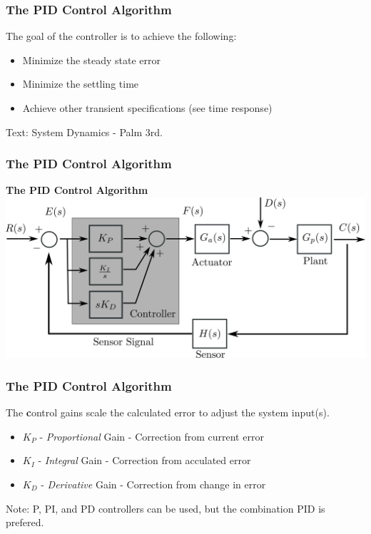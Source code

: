 \documentclass[fleqn]{beamer} %
\newcommand{\sectionIsubsectionIVtitle}{The PID Control Algorithm}
\begin{document}
			\begin{frame}
				\frametitle{\sectionIsubsectionIVtitle}
				\bigskip

				The goal of the controller is to achieve the following:
				\begin{itemize}

					\item Minimize the steady state error
					\item Minimize the settling time
					\item Achieve other transient specifications (see time response)

				\end{itemize}

				\btVFill
				{\tiny Text: System Dynamics - Palm 3rd.}

			\end{frame}	

			\begin{frame}
				\frametitle{\sectionIsubsectionIVtitle}
				\bigskip

				\textbf{The PID Control Algorithm}
				\includegraphics[scale=0.0375]{images/closed_loop_control_pid.png}

				\btVFill
			\end{frame}	

			\begin{frame}
				\frametitle{\sectionIsubsectionIVtitle}
				\bigskip

				The {\textbf control gains} scale the calculated error to adjust the system input(s).

				\vspace*{5mm}
				\begin{itemize}

					\item $K_P$ - {\it Proportional} Gain - Correction from current error \vspace*{5mm}
					\item $K_I$ - {\it Integral} Gain - Correction from acculated error \vspace*{5mm}
 					\item $K_D$ - {\it Derivative} Gain - Correction from change in error \vspace*{5mm}

				\end{itemize}

				Note: P, PI, and PD controllers can be used, but the combination PID is prefered. 
				

				\btVFill
			\end{frame}
\end{document}
